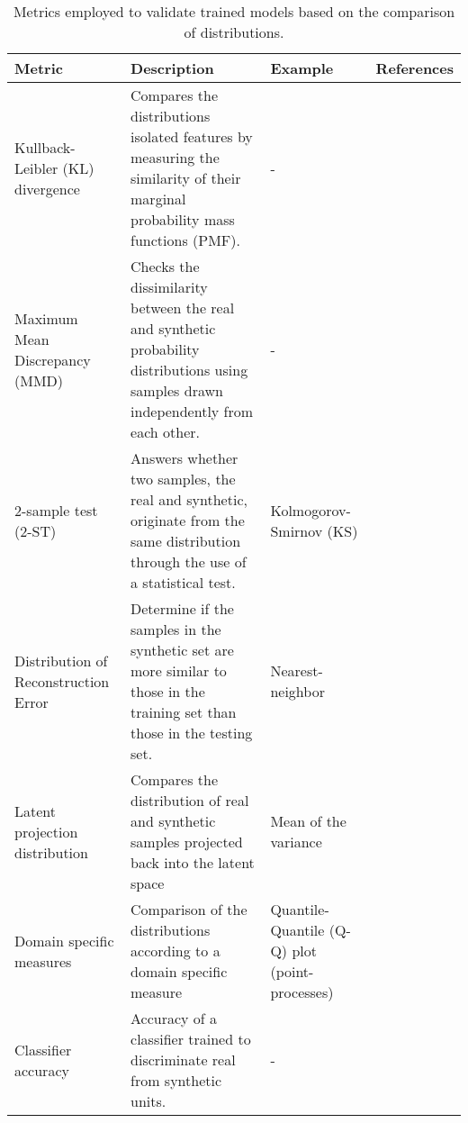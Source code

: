 \begin{table}
    \caption{Metrics employed to validate trained models based on the comparison of distributions.\label{tab:evaldist}} 
        
    \begin{tabular}{@{} p{} p{} p{} p{} @{}}\toprule
        
        Metric & Description & Example & References\\\midrule
        
        Kullback-Leibler (KL) divergence & Compares the distributions isolated features by measuring the similarity of their marginal probability mass functions (PMF). & - &
        \cite{Goncalves2020}\\
        
        Maximum Mean Discrepancy (MMD) & 
        Checks the dissimilarity between the real and synthetic probability distributions using samples drawn independently from each other. & - &
        \cite{esteban2017real}\\
        
        2-sample test (2-ST) & Answers whether two samples, the real and synthetic, originate from the same distribution through the use of a statistical test. & 
        Kolmogorov-Smirnov (KS) & 
        \cite{Fisher2019,Baowaly2019}\\
        
        Distribution of Reconstruction Error & 
        Determine if the samples in the synthetic set are more similar to those in the training set than those in the testing set. & Nearest-neighbor &
        \cite{esteban2017real}\\
        
        Latent projection distribution & 
        Compares the distribution of real and synthetic samples projected back into the latent space & Mean of the variance & \cite{Zhang2020-wp}\\
        
        Domain specific measures & Comparison of the distributions according to a domain specific measure & Quantile-Quantile (Q-Q) plot (point-processes) & \cite{Xiao2017-lh}\\
        
        Classifier accuracy & Accuracy of a classifier trained to discriminate real from synthetic units. & - & \cite{Fisher2019,walsh2020generating}\\\bottomrule
        
    \end{tabular}
\end{table}

